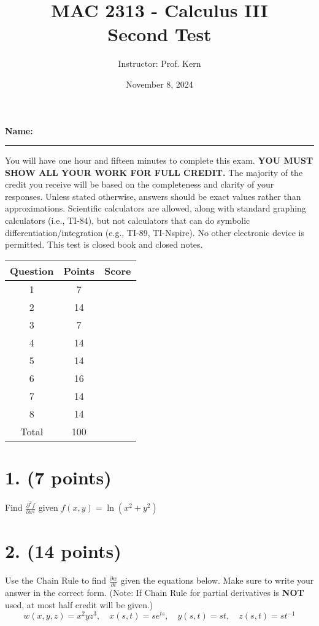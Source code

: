 \documentclass[12pt]{article}
\title{MAC 2313 - Calculus III \\ Second Test}
\date{November 8, 2024}
\author{Instructor: Prof. Kern}
\begin{document}
\maketitle

\noindent
\textbf{Name:} \rule{10cm}{0.4pt}

\vspace{0.5cm}

\noindent
You will have one hour and fifteen minutes to complete this exam. \textbf{YOU MUST SHOW ALL YOUR WORK FOR FULL CREDIT.} The majority of the credit you receive will be based on the completeness and clarity of your responses. Unless stated otherwise, answers should be exact values rather than approximations. Scientific calculators are allowed, along with standard graphing calculators (i.e., TI-84), but not calculators that can do symbolic differentiation/integration (e.g., TI-89, TI-Nspire). No other electronic device is permitted. This test is closed book and closed notes.

\vspace{0.5cm}

\noindent
\begin{tabular}{|c|c|c|}
\hline
Question & Points & Score \\
\hline
1 & 7 & \\
2 & 14 & \\
3 & 7 & \\
4 & 14 & \\
5 & 14 & \\
6 & 16 & \\
7 & 14 & \\
8 & 14 & \\
\hline
Total & 100 & \\
\hline
\end{tabular}

\newpage

\section*{1. (7 points)}
Find \( \frac{\partial^2 f}{\partial x^2} \) given \( f(x, y) = \ln(x^2 + y^2) \)

\section*{2. (14 points)}
Use the Chain Rule to find \( \frac{\partial w}{\partial t} \) given the equations below. Make sure to write your answer in the correct form. (Note: If Chain Rule for partial derivatives is \textbf{NOT} used, at most half credit will be given.)
\[
w(x, y, z) = x^2 y z^3, \quad x(s, t) = s e^{ts}, \quad y(s, t) = st, \quad z(s, t) = st^{-1}
\]
\end{document}
